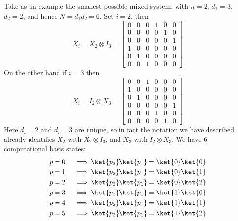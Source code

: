 Take as an example the smallest possible mixed system, with $n = 2$, $d_1 = 3$, $d_2 = 2$, and hence $N = d_1d_2 = 6$. Set $i = 2$, then
\[X_i = X_2 \otimes I_3 = \begin{bmatrix}
0 & 0 & 0 & 1 & 0 & 0 \\
0 & 0 & 0 & 0 & 1 & 0 \\
0 & 0 & 0 & 0 & 0 & 1 \\
1 & 0 & 0 & 0 & 0 & 0 \\
0 & 1 & 0 & 0 & 0 & 0 \\
0 & 0 & 1 & 0 & 0 & 0
\end{bmatrix}\]
On the other hand if $i = 3$ then
\[X_i = I_2 \otimes X_3 = \begin{bmatrix}
	0 & 0 & 1 & 0 & 0 & 0 \\
	1 & 0 & 0 & 0 & 0 & 0 \\
	0 & 1 & 0 & 0 & 0 & 0 \\
	0 & 0 & 0 & 0 & 0 & 1 \\
	0 & 0 & 0 & 1 & 0 & 0 \\
	0 & 0 & 0 & 0 & 1 & 0
\end{bmatrix}\]
Here $d_i = 2$ and $d_i = 3$ are unique, so in fact the notation we have described already identifies $X_2$ with $X_2 \otimes I_3$, and $X_3$ with $I_2 \otimes X_3$. We have 6 computational basis states:
\begin{align*}
	p = 0 &&& \implies \ket{p_2}\ket{p_1} = \ket{0}\ket{0} \\
	p = 1 &&& \implies \ket{p_2}\ket{p_1} = \ket{0}\ket{1} \\
	p = 2 &&& \implies \ket{p_2}\ket{p_1} = \ket{0}\ket{2} \\
	p = 3 &&& \implies \ket{p_2}\ket{p_1} = \ket{1}\ket{0} \\
	p = 4 &&& \implies \ket{p_2}\ket{p_1} = \ket{1}\ket{1} \\
	p = 5 &&& \implies \ket{p_2}\ket{p_1} = \ket{1}\ket{2} \\
\end{align*}

